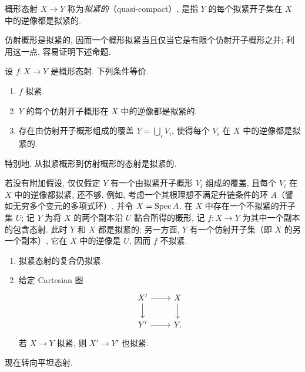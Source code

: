 \begin{definition}\label{ch01:def1.3}
概形态射 $X\to Y$ 称为\emph{拟紧的}（quasi-compact）, 是指 $Y$ 的每个拟紧开子集在 $X$ 中的逆像都是拟紧的.
\end{definition}

仿射概形是拟紧的, 因而一个概形拟紧当且仅当它是有限个仿射开子概形之并; 利用这一点, 容易证明下述命题.

\begin{proposition}\label{ch01:prop1.4}
设 $f\colon X\to Y$ 是概形态射. 下列条件等价.
\begin{enumerate}
\item $f$ 拟紧.
\item $Y$ 的每个仿射开子概形在 $X$ 中的逆像都是拟紧的.
\item 存在由仿射开子概形组成的覆盖 $Y=\bigcup_i V_i$, 使得每个 $V_i$ 在 $X$ 中的逆像都是拟紧的.
\end{enumerate}
特别地, 从拟紧概形到仿射概形的态射是拟紧的.
\end{proposition}

\begin{remark}\label{ch01:rem1.5}
若没有附加假设, 仅仅假定 $Y$ 有一个由拟紧开子概形 $V_i$ 组成的覆盖, 且每个 $V_i$ 在 $X$ 中的逆像都拟紧, 还不够. 例如, 考虑一个其根理想不满足升链条件的环 $A$（譬如无穷多个变元的多项式环）, 并令 $X=\operatorname{Spec} A$. 在 $X$ 中存在一个不拟紧的开子集 $U$; 记 $Y$ 为将 $X$ 的两个副本沿 $U$ 黏合所得的概形, 记 $f\colon X\to Y$ 为其中一个副本的包含态射. 此时 $Y$ 和 $X$ 都是拟紧的; 另一方面, $Y$ 有一个仿射开子集（即 $X$ 的另一个副本）, 它在 $X$ 中的逆像是 $U$, 因而 $f$ 不拟紧.
\end{remark}

\begin{proposition}\label{ch01:prop1.6}
\begin{enumerate}
\item 拟紧态射的复合仍拟紧.
\item 给定 Cartesian 图
\[\begin{tikzcd}X'\ar[r]\ar[d]&X\ar[d]\\Y'\ar[r]&Y,\end{tikzcd}\]
若 $X\to Y$ 拟紧, 则 $X'\to Y'$ 也拟紧.
\end{enumerate}
\end{proposition}

现在转向平坦态射.

